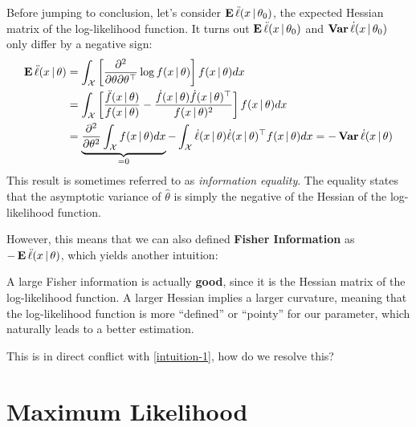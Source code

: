 \documentclass[a4paper]{article}
\begin{document}
Before jumping to conclusion,
let's consider $\operatorname{\text{\textrm{\upshape\textbf{E}}}}\ddot\ell(x\,|\,\theta_0)$,
the expected Hessian matrix of the log-likelihood function.
It turns out $\operatorname{\text{\textrm{\upshape\textbf{E}}}}\ddot\ell(x\,|\,\theta_0)$ and $\operatorname{\text{\textrm{\upshape\textbf{Var}}}}\dot\ell(x\,|\,\theta_0)$ only differ by a negative sign:
\begin{align*}
	\operatorname{\text{\textrm{\upshape\textbf{E}}}}\ddot\ell(x\,|\,\theta)
	&= \int_{\mathcal{X}}
	\left[
	\frac{\partial^2}{\partial\theta\partial\theta^{\top}} \log f(x\,|\,\theta)
	\right]
	f(x\,|\,\theta) dx \\
	&= \int_{\mathcal{X}}
	\left[
	\frac{\ddot f(x\,|\,\theta)}{f(x\,|\,\theta)}
	- \frac{\dot f(x\,|\,\theta)\dot f(x\,|\,\theta)^{\top}}{f(x\,|\,\theta)^2}
	\right]
	f(x\,|\,\theta) dx \\
	&= \underbrace{\frac{\partial^2}{\partial\theta^2} \int_{\mathcal{X}} f(x\,|\,\theta) dx}_{=0}
	- \int_{\mathcal{X}} \dot\ell(x\,|\,\theta)\dot\ell(x\,|\,\theta)^{\top} f(x\,|\,\theta) dx
	= -\operatorname{\text{\textrm{\upshape\textbf{Var}}}}\dot\ell(x\,|\,\theta)
\end{align*}
This result is sometimes referred to as \emph{information equality}.
The equality states that the asymptotic variance of $\hat\theta$ is simply the negative of the Hessian of the log-likelihood function.

However, this means that we can also defined \textbf{Fisher Information} as $-\operatorname{\text{\textrm{\upshape\textbf{E}}}}\ddot\ell(x\,|\,\theta)$,
which yields another intuition:

\begin{intuition}\label{intuition-2}
	A large Fisher information is actually \textbf{good},
	since it is the Hessian matrix of the log-likelihood function.
	A larger Hessian implies a larger curvature,
	meaning that the log-likelihood function is more ``defined'' or ``pointy'' for our parameter,
	which naturally leads to a better estimation.
\end{intuition}

This is in direct conflict with \autoref{intuition-1},
how do we resolve this?

\section{Maximum Likelihood}
\end{document}
